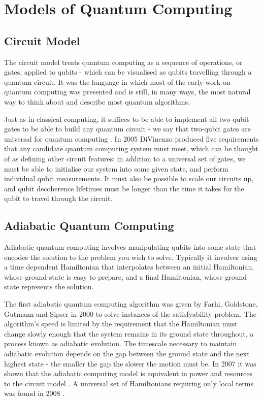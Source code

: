 \section{Models of Quantum Computing}

\subsection{Circuit Model}

The circuit model treats quantum computing as a sequence of operations, or gates, applied to qubits - which can be visualised as qubits travelling through a quantum circuit. It was the language in which most of the early work on quantum computing was presented and is still, in many ways, the most natural way to think about and describe most quantum algorithms.

Just as in classical computing, it suffices to be able to implement all two-qubit gates to be able to build any quantum circuit - we say that two-qubit gates are universal for quantum computing \cite{two_bit_gates_universal}. In 2005 DiVinenzo produced five requirements \cite{divincenzo_requirements} that any candidate quantum computing system must meet, which can be thought of as defining other circuit features: in addition to a universal set of gates, we must be able to initialise our system into some given state, and perform individual qubit measurements. It must also be possible to scale our circuits up, and qubit decoherence lifetimes must be longer than the time it takes for the qubit to travel through the circuit.

\subsection{Adiabatic Quantum Computing}

Adiabatic quantum computing involves manipulating qubits into some state that encodes the solution to the problem you wish to solve. Typically it involves using a time dependent Hamiltonian that interpolates between an initial Hamiltonian, whose ground state is easy to prepare, and a final Hamiltonian, whose ground state represents the solution. 

The first adiabatic quantum computing algorithm was given by Farhi, Goldstone, Gutmann and Sipser in 2000 \cite{adiabatic_qc} to solve instances of the satisfyability problem. The algorithm's speed is limited by the requirement that the Hamiltonian must change slowly enough that the system remains in its ground state throughout, a process known as adiabatic evolution. The timescale necessary to maintain adiabatic evolution depends on the gap between the ground state and the next highest state - the smaller the gap the slower the motion must be. In 2007 it was shown that the adiabatic computing model is equivalent in power and resources to the circuit model \cite{adiabatic_equivalent}. A universal set of Hamiltonians requiring only local terms was found in 2008 \cite{hamiltonians_for_adiabatic_qc}.


